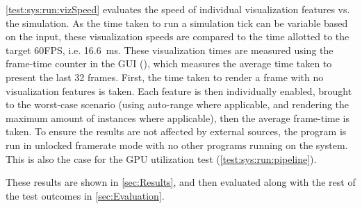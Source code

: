 

\cref{test:sys:run:vizSpeed} evaluates the speed of individual visualization features vs. the simulation.
As the time taken to run a simulation tick can be variable based on the input, these visualization speeds are compared to the time allotted to the target 60FPS, i.e. \SI{16.6}{\milli\second}.
These visualization times are measured using the frame-time counter in the GUI (), which measures the average time taken to present the last 32 frames.
First, the time taken to render a frame with no visualization features is taken.
Each feature is then individually enabled, brought to the worst-case scenario (using auto-range where applicable, and rendering the maximum amount of instances where applicable), then the average frame-time is taken.
To ensure the results are not affected by external sources, the program is run in unlocked framerate mode with no other programs running on the system.
This is also the case for the GPU utilization test (\cref{test:sys:run:pipeline}).

These results are shown in \cref{sec:Results}, and then evaluated along with the rest of the test outcomes in \cref{sec:Evaluation}.